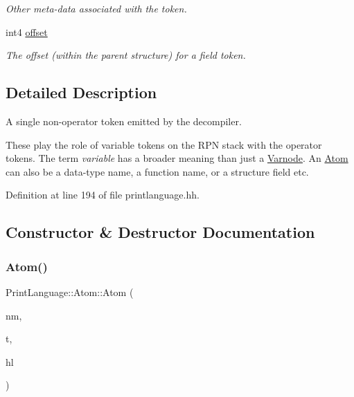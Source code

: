 \begin{DoxyCompactItemize}
\begin{tabbing}
\end{tabbing}\begin{DoxyCompactList}\small\item\em Other meta-\/data associated with the token. \end{DoxyCompactList}\item 
int4 \mbox{\hyperlink{struct_print_language_1_1_atom_a28454691b4629928d3b57d3a2f80265d}{offset}}
\begin{DoxyCompactList}\small\item\em The offset (within the parent structure) for a {\itshape field} token. \end{DoxyCompactList}\end{DoxyCompactItemize}


\subsection{Detailed Description}
A single non-\/operator token emitted by the decompiler. 

These play the role of variable tokens on the R\+PN stack with the operator tokens. The term {\itshape variable} has a broader meaning than just a \mbox{\hyperlink{class_varnode}{Varnode}}. An \mbox{\hyperlink{struct_print_language_1_1_atom}{Atom}} can also be a data-\/type name, a function name, or a structure field etc. 

Definition at line 194 of file printlanguage.\+hh.



\subsection{Constructor \& Destructor Documentation}
\mbox{\label{struct_print_language_1_1_atom_a23a38bc6f97afc98090701ac762acd59}} 
\subsubsection{\texorpdfstring{Atom()}{Atom()}\hspace{0.1cm}{\footnotesize\ttfamily [1/6]}}
{\footnotesize\ttfamily Print\+Language\+::\+Atom\+::\+Atom (\begin{DoxyParamCaption}\item[{const string \&}]{nm,  }\item[{\mbox{\hyperlink{class_print_language_a7102f70f47777d8b17af52c5157c473e}{tagtype}}}]{t,  }\item[{\mbox{\hyperlink{class_emit_xml_a7c3577436da429c3c75f4b82cac6864f}{Emit\+Xml\+::syntax\+\_\+highlight}}}]{hl }\end{DoxyParamCaption})\hspace{0.3cm}{\ttfamily [inline]}}



